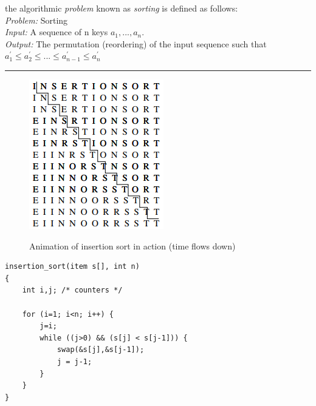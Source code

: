 the algorithmic \emph{problem} known as \emph{sorting} is defined as follows: \\
\emph{Problem:} Sorting \\
\emph{Input:} A sequence of n keys $a_{1},...,a_{n}$. \\
\emph{Output:} The permutation (reordering) of the input sequence such that $a_{1}^{'} \leq a_{2}^{'} \leq ... \leq a_{n-1}^{'} \leq a_{n}^{'}$\\


\noindent\rule{\textwidth}{0.4pt}

\begin{figure}[H]
  \centering
     \includegraphics[scale=0.6]{./insertion_sort.png}
  \label{fig:demo-diagram}
  \caption{Animation of insertion sort in action (time flows down)}
\end{figure}
%
\begin{verbatim}
insertion_sort(item s[], int n)
{
    int i,j; /* counters */
    
    for (i=1; i<n; i++) {
        j=i;
        while ((j>0) && (s[j] < s[j-1])) {
            swap(&s[j],&s[j-1]);
            j = j-1;
        }
    }
}
\end{verbatim}



